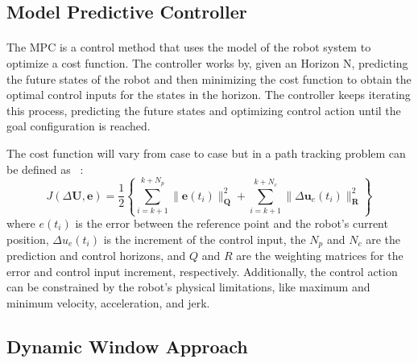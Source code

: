 \subsection{Model Predictive Controller}
\label{subsec:MPC}
\paragraph{}The \gls{MPC} is a control method that uses the model of the robot system to optimize 
a cost function. The controller works by, given an Horizon N, predicting the future states of the robot and then minimizing
 the cost function to obtain the optimal control inputs for the states in the horizon. The controller keeps iterating 
this process, predicting the future states and optimizing control action until the goal configuration is reached.

The cost function will vary from case to case but in a path tracking problem can be defined as ~\cite{MPCcost}:
\begin{equation}
    J(\Delta \mathbf{U}, \mathbf{e}) = \frac{1}{2} \left\{ \sum_{i=k+1}^{k+N_p} \|\mathbf{e}(t_i)\|_{\mathbf{Q}}^2 + \sum_{i=k+1}^{k+N_c} \|\Delta \mathbf{u}_e(t_i)\|_{\mathbf{R}}^2 \right\}
\end{equation}
where $e(t_i)$ is the error between the reference point and the robot's current position, $\Delta u_e(t_i)$ is the increment of the control input, the 
$N_p$ and $N_c$ are the prediction and control horizons, and $Q$ and $R$ are the weighting matrices for the error and control input increment, respectively. 
Additionally, the control action can be constrained by the robot's physical limitations, like maximum and minimum velocity, acceleration, and jerk.

\subsection{Dynamic Window Approach}
\label{subsec:DWA}
